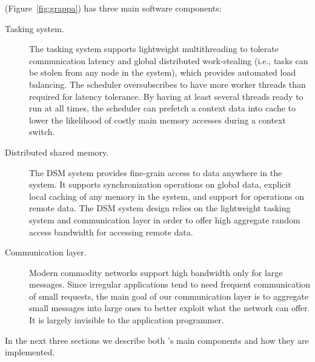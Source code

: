 \Grappa (Figure~\ref{fig:grappa}) has three main software components:
\begin{description}

\item [Tasking system.] The tasking system supports lightweight multithreading
to tolerate communication latency and global distributed work-stealing (i.e.,
tasks can be stolen from any node in the system), which provides automated
load balancing. The scheduler oversubscribes to have more worker threads than
required for latency tolerance. By having at least several threads ready to
run at all times, the scheduler can prefetch a context data into cache to
lower the likelihood of costly main memory accesses during a context switch. 

\item[Distributed shared memory.] The DSM system provides
fine-grain access to data anywhere in the system. It supports synchronization
operations on global data, explicit local caching of any memory in the system,
and support for operations on remote data.
The DSM system design relies on the lightweight tasking system and
communication layer in order to offer high aggregate random
access bandwidth for accessing remote data.

\item[Communication layer.] Modern commodity networks
support high bandwidth only for large messages. Since irregular applications
tend to need frequent communication of small requests, the main goal of our
communication layer is to aggregate small messages into large ones to better
exploit what the network can offer. It is largely invisible to the application
programmer.


\end{description}



In the next three sections we describe both \Grappa's main components and how they are implemented.

